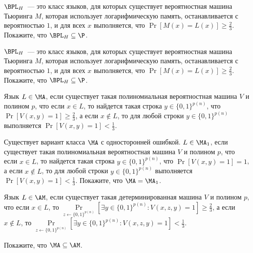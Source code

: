 

\begin{task}
    $\BPL_H$~--- это класс языков, для которых существует вероятностная машина Тьюринга $M$, которая использует логарифмическую
    память, останавливается с вероятностью $1$, и для всех $x$ выполняется, что $\Pr[M(x) = L(x)] \ge \frac{2}{3}$. Покажите, что
    $\BPL_H \subseteq \P$.
\end{task}

\begin{task}
    $\BPL_H$~--- это класс языков, для которых существует вероятностная машина Тьюринга $M$, которая использует логарифмическую
    память, останавливается с вероятностью $1$, и для всех $x$ выполняется, что $\Pr[M(x) = L(x)] \ge \frac{2}{3}$. Покажите, что
    $\BPL_H \subseteq \P$.
\end{task}


\begin{definition}
    Язык $L \in \MA$, если  существует такая полиномиальная вероятностная машина $V$ и полином $p$, что если $x \in L$, то
    найдется такая строка $y \in \{0, 1\}^{p(n)}$, что $\Pr[V(x, y) = 1] \ge \frac{2}{3}$, а если $x \notin L$, то для любой
    строки $y \in \{0, 1\}^{p(n)}$ выполняется $\Pr[V(x, y) = 1] < \frac{1}{3}$. 
\end{definition}


\begin{task}
    Существует вариант класса $\MA$ с односторонней ошибкой. $L \in \MA_1$, если существует такая полиномиальная вероятностная
    машина $V$ и полином $p$, что если $x \in L$, то найдется такая строка $y \in \{0, 1\}^{p(n)}$, что $\Pr[V(x, y) = 1] = 1$, а
    если $x \notin L$, то для любой строки $y \in \{0, 1\}^{p(n)}$ выполняется $\Pr[V(x, y) = 1] < \frac{1}{3}$. Покажите, что
    $\MA = \MA_1$.
\end{task}



\begin{definition}
    Язык $L \in \AM$, если  существует такая детерминированная машина $V$ и полином $p$, что если $x \in L$, то
    $\Pr\limits_{z \gets \{0, 1\}^{p(n)}}[\exists y \in \{0, 1\}^{p(n)}: V(x, z, y) = 1] \ge \frac{2}{3}$, а если $x \notin L$, то 
	$\Pr\limits_{z \gets \{0, 1\}^{p(n)}}[\exists y \in \{0, 1\}^{p(n)}: V(x, z, y) = 1] < \frac{1}{3}$.
\end{definition}


\begin{task}
    Покажите, что $\MA \subseteq \AM$.
\end{task}


